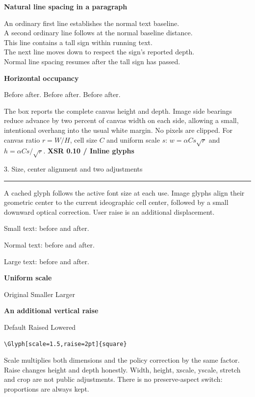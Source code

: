 \documentclass[11pt,a4paper]{article}
\newcommand\PageTitle[1]{{\color{ink}\LARGE\bfseries XSR 0.10 / Inline glyphs}\par
 {\color{accent}\large #1}\par\medskip\hrule\medskip}
\begin{document}
\textbf{Natural line spacing in a paragraph}

\begingroup\setlength{\parskip}{0pt}
\noindent An ordinary first line establishes the normal text baseline.\\
A second ordinary line follows at the normal baseline distance.\\
This line contains a tall sign  within running text.\\
The next line moves down to respect the sign's reported depth.\\
Normal line spacing resumes after the tall sign has passed.\par
\endgroup

\textbf{Horizontal occupancy}

Before  after. Before  after.
Before  after.

The box reports the complete canvas height and depth. Image side bearings
reduce advance by two percent of canvas width on each side, allowing a small,
intentional overhang into the usual white margin. No pixels are clipped.
\vfill
\small For canvas ratio $r=W/H$, cell size $C$ and uniform scale $s$:
$w=\alpha Cs\sqrt{r}$ and $h=\alpha Cs/\sqrt{r}$.
\newpage
\PageTitle{3. Size, center alignment and two adjustments}
A cached glyph follows the active font size at each use. Image glyphs align
their geometric center to the current ideographic cell center, followed by a
small downward optical correction. User raise is an additional displacement.

{\small Small text: before  and  after.\par}
Normal text: before  and  after.\par
{\Large Large text: before  and  after.\par}

\textbf{Uniform scale}

Original \quad
Smaller \quad
Larger 

\textbf{An additional vertical raise}

Default \quad
Raised \quad
Lowered 

\begin{verbatim}
\Glyph[scale=1.5,raise=2pt]{square}
\end{verbatim}

Scale multiplies both dimensions and the policy correction by the same factor.
Raise changes height and depth honestly. Width, height, xscale, yscale, stretch and crop are not public
adjustments. There is no preserve-aspect switch: proportions are always kept.
\end{document}

